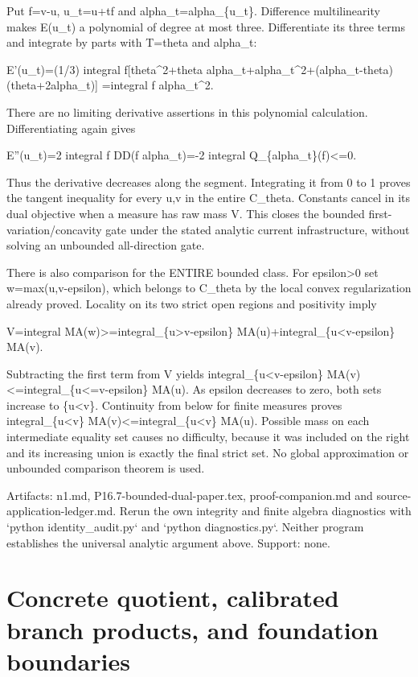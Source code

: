 \documentclass[11pt]{article}
\begin{document}
Put f=v-u, u\_t=u+tf and alpha\_t=alpha\_\{u\_t\}. Difference multilinearity makes E(u\_t) a polynomial of degree at most three. Differentiate its three terms and integrate by parts with T=theta and alpha\_t:

E'(u\_t)=(1/3) integral f[theta\textasciicircum{}2+theta alpha\_t+alpha\_t\textasciicircum{}2+(alpha\_t-theta)(theta+2alpha\_t)]
        =integral f alpha\_t\textasciicircum{}2.

There are no limiting derivative assertions in this polynomial calculation. Differentiating again gives

E''(u\_t)=2 integral f DD(f alpha\_t)=-2 integral Q\_\{alpha\_t\}(f)<=0.

Thus the derivative decreases along the segment. Integrating it from 0 to 1 proves the tangent inequality for every u,v in the entire C\_theta. Constants cancel in its dual objective when a measure has raw mass V. This closes the bounded first-variation/concavity gate under the stated analytic current infrastructure, without solving an unbounded all-direction gate.

There is also comparison for the ENTIRE bounded class. For epsilon>0 set w=max(u,v-epsilon), which belongs to C\_theta by the local convex regularization already proved. Locality on its two strict open regions and positivity imply

V=integral MA(w)>=integral\_\{u>v-epsilon\} MA(u)+integral\_\{u<v-epsilon\} MA(v).

Subtracting the first term from V yields integral\_\{u<v-epsilon\} MA(v)<=integral\_\{u<=v-epsilon\} MA(u). As epsilon decreases to zero, both sets increase to \{u<v\}. Continuity from below for finite measures proves integral\_\{u<v\} MA(v)<=integral\_\{u<v\} MA(u). Possible mass on each intermediate equality set causes no difficulty, because it was included on the right and its increasing union is exactly the final strict set. No global approximation or unbounded comparison theorem is used.

Artifacts: n1.md, P16.7-bounded-dual-paper.tex, proof-companion.md and source-application-ledger.md. Rerun the own integrity and finite algebra diagnostics with `python identity\_audit.py` and `python diagnostics.py`. Neither program establishes the universal analytic argument above. Support: none.

\section*{Concrete quotient, calibrated branch products, and foundation boundaries}
\end{document}
